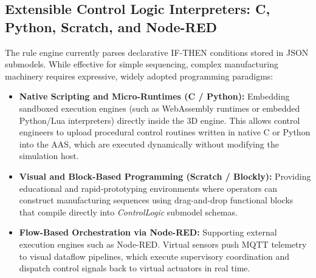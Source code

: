 \subsection{Extensible Control Logic Interpreters: C, Python, Scratch, and Node-RED}
The rule engine currently parses declarative IF-THEN conditions stored in \gls{JSON} submodels. While effective for simple sequencing, complex manufacturing machinery requires expressive, widely adopted programming paradigms:
\begin{itemize}
    \item \textbf{Native Scripting and Micro-Runtimes (C / Python):} Embedding sandboxed execution engines (such as WebAssembly runtimes or embedded Python/Lua interpreters) directly inside the 3D engine. This allows control engineers to upload procedural control routines written in native C or Python into the \gls{AAS}, which are executed dynamically without modifying the simulation host.
    \item \textbf{Visual and Block-Based Programming (Scratch / Blockly):} Providing educational and rapid-prototyping environments where operators can construct manufacturing sequences using drag-and-drop functional blocks that compile directly into \textit{ControlLogic} submodel schemas.
    \item \textbf{Flow-Based Orchestration via Node-RED:} Supporting external execution engines such as Node-RED. Virtual sensors push \gls{MQTT} telemetry to visual dataflow pipelines, which execute supervisory coordination and dispatch control signals back to virtual actuators in real time.
\end{itemize}


